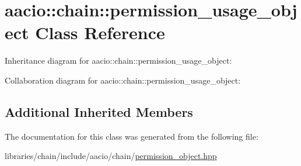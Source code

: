 \hypertarget{classaacio_1_1chain_1_1permission__usage__object}{}\section{aacio\+:\+:chain\+:\+:permission\+\_\+usage\+\_\+object Class Reference}
\label{classaacio_1_1chain_1_1permission__usage__object}


Inheritance diagram for aacio\+:\+:chain\+:\+:permission\+\_\+usage\+\_\+object\+:


Collaboration diagram for aacio\+:\+:chain\+:\+:permission\+\_\+usage\+\_\+object\+:
\subsection*{Additional Inherited Members}


The documentation for this class was generated from the following file\+:\begin{DoxyCompactItemize}
\item 
libraries/chain/include/aacio/chain/\mbox{\hyperlink{permission__object_8hpp}{permission\+\_\+object.\+hpp}}\end{DoxyCompactItemize}
